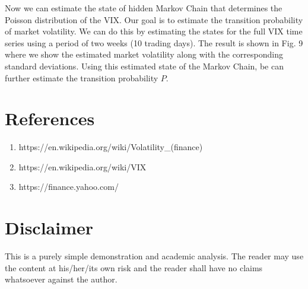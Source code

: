\documentclass[a4paper, 11pt]{article}
\begin{document}
Now we can estimate the state of hidden Markov Chain that determines the Poisson distribution of the VIX. Our goal is to estimate the transition probability of market volatility. We can do this by estimating the states for the full VIX time series using a period of two weeks (10 trading days). The result is shown in Fig. 9 where we show the estimated market volatility along with the corresponding standard deviations. Using this estimated state of the Markov Chain, be can further estimate the transition probability $P$. 





\section*{References}
\begin{enumerate}
\item https://en.wikipedia.org/wiki/Volatility\_(finance)
\item https://en.wikipedia.org/wiki/VIX
\item https://finance.yahoo.com/
\end{enumerate}


\section*{Disclaimer}
This is a purely simple demonstration and academic analysis. The reader may use the content at his/her/its own risk and the reader shall have no claims whatsoever against the author. 
\end{document}
